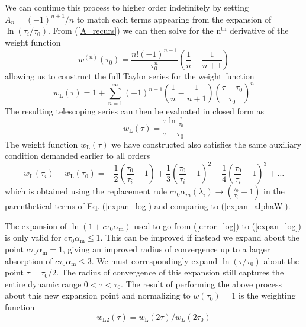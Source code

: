 We can continue this process to higher order indefinitely by setting $A_n=(-1)^{n+1}/n$ to match each terms appearing from the expansion of $\ln\left(\tau_i/\tau_0\right)$. From (\ref{A_recurs}) we can then solve for the n$^\mathrm{th}$ derivative of the weight function
\begin{equation}
	w^{(n)}(\tau_0) = \frac{n!(-1)^{n-1}}{\tau_0^n}\left(\frac{1}{n}-\frac{1}{n+1}\right)
\end{equation}
allowing us to construct the full Taylor series for the weight function
\begin{equation}
	w_\mathrm{L}(\tau) = 1+\sum_{n=1}^{\infty}(-1)^{n-1}\left(\frac{1}{n}-\frac{1}{n+1}\right)\left(\frac{\tau-\tau_0}{\tau_0}\right)^n
\end{equation}
The resulting telescoping series can then be evaluated in closed form as
\begin{equation} \label{weight_log}
	w_\mathrm{L}(\tau) = \frac{\tau\ln\frac{\tau}{\tau_0}}{\tau-\tau_0}
\end{equation}
The weight function $w_\mathrm{L}(\tau)$ we have constructed also satisfies the same auxiliary condition demanded earlier to all orders
\begin{equation}
	w_\mathrm{L}(\tau_i) - w_\mathrm{L}(\tau_0) = -\frac{1}{2}\left(\frac{\tau_0}{\tau_i}-1\right) + \frac{1}{3}\left(\frac{\tau_0}{\tau_i}-1\right)^2 - \frac{1}{4}\left(\frac{\tau_0}{\tau_i}-1\right)^3 + \ldots
\end{equation}
which is obtained using the replacement rule $c\tau_0\alpha_m(\lambda_i)\rightarrow \left(\frac{\tau_0}{\tau_i}-1\right)$ in the parenthetical terms of Eq. (\ref{expan_log}) and comparing to (\ref{expan_alphaW}).

The expansion of $\ln(1+c\tau_0\alpha_\mathrm{m})$ used to go from (\ref{error_log}) to (\ref{expan_log}) is only valid for $c\tau_0\alpha_\mathrm{m} \leq 1$. This can be improved if instead we expand about the point $c\tau_0\alpha_\mathrm{m} = 1$, giving an improved radius of convergence up to a larger absorption of $c\tau_0\alpha_\mathrm{m} \leq 3$. We must correspondingly expand $\ln(\tau/\tau_0)$ about the point $\tau = \tau_0/2$. The radius of convergence of this expansion still captures the entire dynamic range $0 < \tau < \tau_0$. The result of performing the above process about this new expansion point and normalizing to $w(\tau_0)=1$ is the weighting function
\begin{equation}\label{weight_L2}
	w_\mathrm{L2}(\tau) = w_\mathrm{L}(2\tau) \big/ w_L(2\tau_0)
\end{equation}


